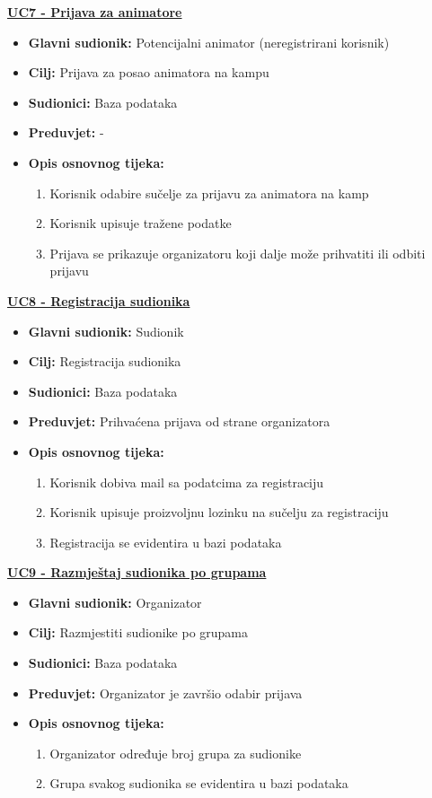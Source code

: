 \noindent \underline{\textbf{UC7 - Prijava za animatore}}
\begin{itemize}
	\item \textbf{Glavni sudionik:} Potencijalni animator (neregistrirani korisnik)
	\item \textbf{Cilj:} Prijava za posao animatora na kampu
	\item \textbf{Sudionici:} Baza podataka
	\item \textbf{Preduvjet:} -
	\item \textbf{Opis osnovnog tijeka:} 
	\begin{enumerate}	
		\item Korisnik odabire sučelje za prijavu za animatora na kamp
		\item Korisnik upisuje tražene podatke
		\item Prijava se prikazuje organizatoru koji dalje može prihvatiti ili odbiti prijavu\\
	\end{enumerate}
	
\end{itemize}

\noindent \underline{\textbf{UC8 - Registracija sudionika}}
\begin{itemize}
	\item \textbf{Glavni sudionik:} Sudionik
	\item \textbf{Cilj:} Registracija sudionika
	\item \textbf{Sudionici:} Baza podataka
	\item \textbf{Preduvjet:} Prihvaćena prijava od strane organizatora
	\item \textbf{Opis osnovnog tijeka:} 
	\begin{enumerate}	
		\item Korisnik dobiva mail sa podatcima za registraciju
		\item Korisnik upisuje proizvoljnu lozinku na sučelju za registraciju
		\item Registracija se evidentira u bazi podataka\\
	\end{enumerate}
	
\end{itemize}


\noindent \underline{\textbf{UC9 - Razmještaj sudionika po grupama}}
\begin{itemize}
	\item \textbf{Glavni sudionik:} Organizator
	\item \textbf{Cilj:} Razmjestiti sudionike po grupama
	\item \textbf{Sudionici:} Baza podataka
	\item \textbf{Preduvjet:} Organizator je završio odabir prijava
	\item \textbf{Opis osnovnog tijeka:} 
	\begin{enumerate}	
		\item Organizator određuje broj grupa za sudionike
		\item Grupa svakog sudionika se evidentira u bazi podataka\\
	\end{enumerate}
	
\end{itemize}


